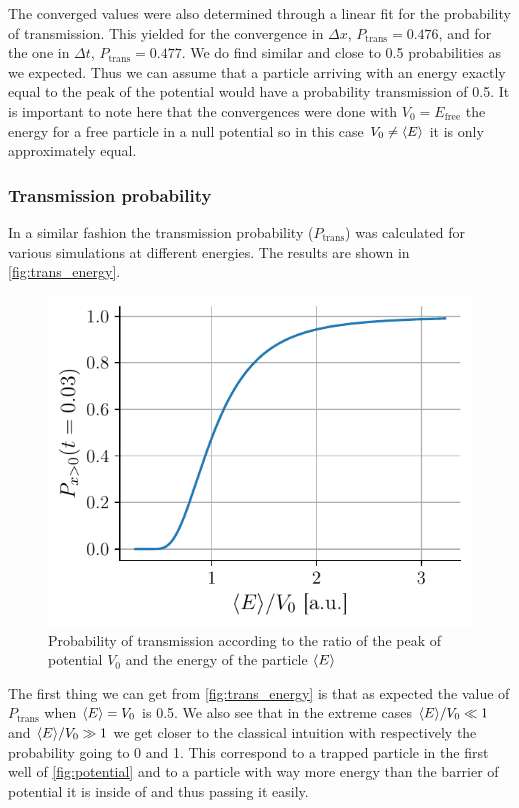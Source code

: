 The converged values were also determined through a linear fit for the probability of transmission. This yielded for the convergence in $\Delta x$, $P_\mathrm{trans} = 0.476$, and for the one in $\Delta t$, $P_\mathrm{trans} = 0.477$. We do find similar and close to 0.5 probabilities as we expected. Thus we can assume that a particle arriving with an energy exactly equal to the peak of the potential would have a probability transmission of 0.5. It is important to note here that the convergences were done with $V_0 = E_\mathrm{free}$ the energy for a free particle in a null potential so in this case $V_0 \neq \langle E \rangle$ it is only approximately equal.

\subsubsection{Transmission probability}
In a similar fashion the transmission probability ($P_\mathrm{trans}$) was calculated for various simulations at different energies. The results are shown in \autoref{fig:trans_energy}.
\begin{figure}[h]
    \centering
    \includegraphics[width = 0.6\linewidth]{figures/energy_probtrans.pdf}
    \caption{Probability of transmission according to the ratio of the peak of potential $V_0$ and the energy of the particle $\langle E \rangle$}
    \label{fig:trans_energy}
\end{figure}

The first thing we can get from \autoref{fig:trans_energy} is that as expected the value of $P_\mathrm{trans}$ when $\langle E \rangle = V_0$ is 0.5. We also see that in the extreme cases $\langle E \rangle/V_0 \ll 1$ and $\langle E \rangle/V_0 \gg 1$ we get closer to the classical intuition with respectively the probability going to 0 and 1. This correspond to a trapped particle in the first well of \autoref{fig:potential} and to a particle with way more energy than the barrier of potential it is inside of and thus passing it easily.

